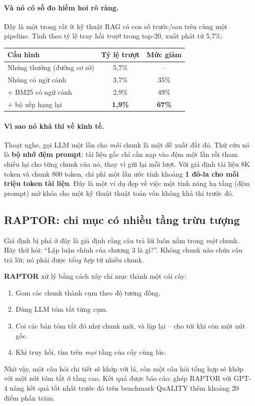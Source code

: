 \paragraph{Và nó có số đo hiếm hoi rõ ràng.} Đây là một trong rất ít kỹ thuật RAG có con số trước/sau trên cùng một pipeline. Tính theo tỷ lệ truy hồi \emph{trượt} trong top-20, xuất phát từ 5{,}7\%:
\begin{center}
\small
\begin{tabular}{@{}lcc@{}}
\toprule
\textbf{Cấu hình} & \textbf{Tỷ lệ trượt} & \textbf{Mức giảm} \\
\midrule
Nhúng thường (đường cơ sở) & 5{,}7\% & -- \\
Nhúng có ngữ cảnh & 3{,}7\% & 35\% \\
\quad + BM25 có ngữ cảnh & 2{,}9\% & 49\% \\
\quad\quad + bộ xếp hạng lại & \textbf{1{,}9\%} & \textbf{67\%} \\
\bottomrule
\end{tabular}
\end{center}

\paragraph{Vì sao nó khả thi về kinh tế.} Thoạt nghe, gọi LLM một lần cho \emph{mỗi} chunk là một đề xuất đắt đỏ. Thứ cứu nó là \textbf{bộ nhớ đệm prompt}: tài liệu gốc chỉ cần nạp vào đệm một lần rồi tham chiếu lại cho từng chunk của nó, thay vì gửi lại mỗi lượt. Với giả định tài liệu 8K token và chunk 800 token, chi phí một lần ước tính khoảng \textbf{1 đô-la cho mỗi triệu token tài liệu}. Đây là một ví dụ đẹp về việc một tính năng hạ tầng (đệm prompt) mở khóa cho một kỹ thuật thuật toán vốn không khả thi trước đó.

\subsection{RAPTOR: chỉ mục có nhiều tầng trừu tượng}
\label{ssec:raptor}

Giả định bị phá ở đây là giả định rằng câu trả lời luôn nằm trong \emph{một} chunk. Hãy thử hỏi: “Lập luận chính của chương 3 là gì?”. Không chunk nào chứa câu trả lời; nó phải được \emph{tổng hợp} từ nhiều chunk.

\textbf{RAPTOR} \cite{sarthi2024raptor} xử lý bằng cách xây chỉ mục thành một cái cây:
\begin{enumerate}
	\item Gom các chunk thành cụm theo độ tương đồng.
	\item Dùng LLM tóm tắt từng cụm.
	\item Coi các bản tóm tắt đó như chunk mới, và lặp lại -- cho tới khi còn một nút gốc.
	\item Khi truy hồi, tìm trên \emph{mọi} tầng của cây cùng lúc.
\end{enumerate}
Nhờ vậy, một câu hỏi chi tiết sẽ khớp với lá, còn một câu hỏi tổng hợp sẽ khớp với một nút tóm tắt ở tầng cao. Kết quả được báo cáo: ghép RAPTOR với GPT-4 nâng kết quả tốt nhất trước đó trên benchmark QuALITY thêm khoảng 20 điểm phần trăm.

